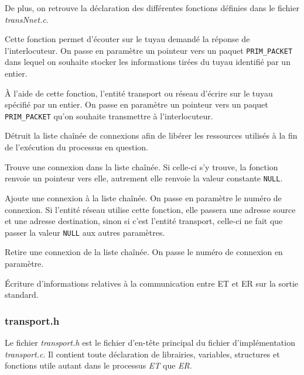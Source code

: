 \documentclass[11pt,french]{article}
\begin{document}
            De plus, on retrouve la déclaration des différentes fonctions définies dans le fichier \emph{transNnet.c}.
            
            Cette fonction permet d'écouter sur le tuyau demandé la réponse de l'interlocuteur. On passe en paramètre un pointeur vers un paquet \texttt{PRIM\_PACKET}
            dans lequel on souhaite stocker les informations tirées du tuyau identifié par un entier.
            
            À l'aide de cette fonction, l'entité transport ou réseau d'écrire sur le tuyau spécifié par un entier. On passe en paramètre un pointeur vers un paquet \texttt{PRIM\_PACKET}
            qu'on souhaite transmettre à l'interlocuteur.
            
            Détruit la liste chaînée de connexions afin de libérer les ressources utilisés à la fin de l'exécution du processus en question.
            
            Trouve une connexion dans la liste chaînée. Si celle-ci s'y trouve, la fonction renvoie un pointeur vers elle, autrement elle renvoie la valeur constante \texttt{NULL}.
            
            Ajoute une connexion à la liste chaînée. On passe en paramètre le numéro de connexion. Si l'entité réseau utilise cette fonction, elle passera une adresse source et une 
            adresse destination, sinon si c'est l'entité transport, celle-ci ne fait que passer la valeur \texttt{NULL} aux autres paramètres.
            
            Retire une connexion de la liste chaînée. On passe le numéro de connexion en paramètre.
            
            Écriture d'informations relatives à la communication entre ET et ER sur la sortie standard.
        \subsubsection{transport.h} %
        \label{ssub:transport.h}
			Le fichier \emph{transport.h} est le fichier d'en-tête principal du fichier d'implémentation \emph{transport.c}. Il contient toute déclaration de librairies, 
            variables, structures et fonctions utile autant dans le processus \emph{ET} que \emph{ER}.\\
            
\end{document}
